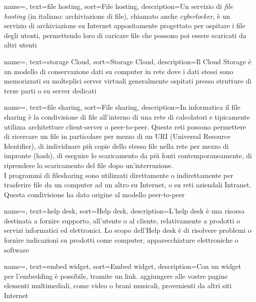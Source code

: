 {
    name=,
    text=file hosting,
    sort=File hosting,
    description={Un servizio di \emph{file hosting} (in italiano: archiviazione di file), chiamato anche \emph{cyberlocker}, è un servizio di archiviazione su Internet appositamente progettato per ospitare i file degli utenti, permettendo loro di caricare file che possono poi essere scaricati da altri utenti}
}

{
    name=,
    text=storage Cloud,
    sort=Storage Cloud,
    description={Il Cloud Storage è un modello di conservazione dati su computer in rete dove i dati stessi sono memorizzati su molteplici server virtuali generalmente ospitati presso strutture di terze parti o su server dedicati}
}

{
    name=,
    text=file sharing,
    sort=File sharing,
    description={In informatica il file sharing è la condivisione di file all'interno di una rete di calcolatori e tipicamente utilizza architetture client-server o peer-to-peer. Queste reti possono permettere di ricercare un file in particolare per mezzo di un URI (Universal Resource Identifier), di individuare più copie dello stesso file nella rete per mezzo di impronte (hash), di eseguire lo scaricamento da più fonti contemporaneamente, di riprendere lo scaricamento del file dopo un'interruzione.\\
    I programmi di filesharing sono utilizzati direttamente o indirettamente per trasferire file da un computer ad un altro su Internet, o su reti aziendali Intranet. Questa condivisione ha dato origine al modello peer-to-peer}
}

{
    name=,
    text=help desk,
    sort=Help desk,
    description={L'help desk è una risorsa destinata a fornire supporto, all'utente o al cliente, relativamente a prodotti o servizi informatici ed elettronici. Lo scopo dell'Help desk è di risolvere problemi o fornire indicazioni su prodotti come computer, apparecchiature elettroniche o software}
}

{
    name=,
    text=embed widget,
    sort=Embed widget,
    description={Con un widget per l'embedding è possibile, tramite un link. aggiungere alle vostre pagine elementi multimediali, come video o brani musicali, provenienti da altri siti Internet}
}

